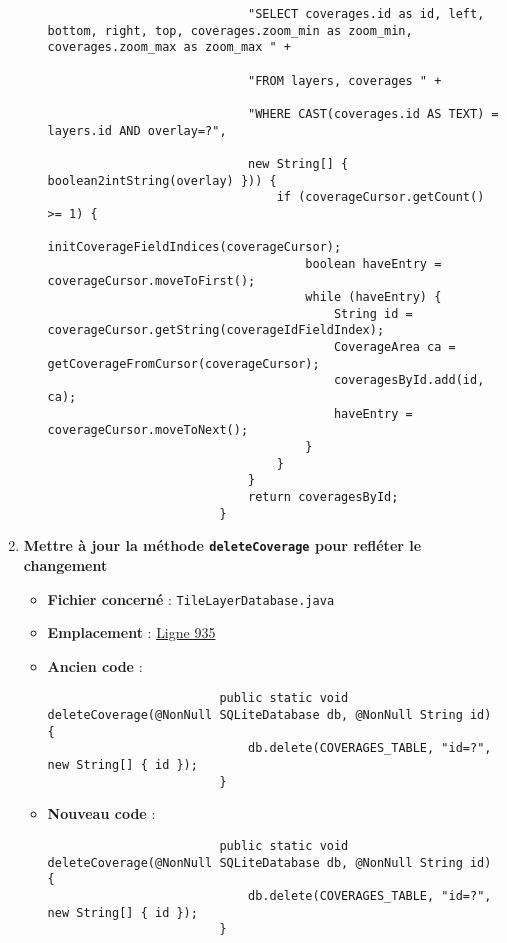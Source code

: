 \begin{enumerate}
\begin{itemize}
\begin{verbatim}
                            "SELECT coverages.id as id, left, bottom, right, top, coverages.zoom_min as zoom_min, coverages.zoom_max as zoom_max " +

                            "FROM layers, coverages " +

                            "WHERE CAST(coverages.id AS TEXT) = layers.id AND overlay=?",

                            new String[] { boolean2intString(overlay) })) {
                                if (coverageCursor.getCount() >= 1) {
                                    initCoverageFieldIndices(coverageCursor);
                                    boolean haveEntry = coverageCursor.moveToFirst();
                                    while (haveEntry) {
                                        String id = coverageCursor.getString(coverageIdFieldIndex);
                                        CoverageArea ca = getCoverageFromCursor(coverageCursor);
                                        coveragesById.add(id, ca);
                                        haveEntry = coverageCursor.moveToNext();
                                    }
                                }
                            }
                            return coveragesById;
                        }
                    \end{verbatim}
          \end{itemize}

    \item \textbf{Mettre à jour la méthode \texttt{deleteCoverage} pour refléter le changement}
          \begin{itemize}
              \item \textbf{Fichier concerné} : \texttt{TileLayerDatabase.java}
              \item \textbf{Emplacement} :
                    \href{https://github.com/MarcusWolschon/osmeditor4android/blob/master/src/main/java/de/blau/android/resources/TileLayerDatabase.java#L935 }{Ligne 935}
              \item \textbf{Ancien code} :
                    \begin{verbatim}
                        public static void deleteCoverage(@NonNull SQLiteDatabase db, @NonNull String id) {
                            db.delete(COVERAGES_TABLE, "id=?", new String[] { id });
                        }
                    \end{verbatim}
              \item \textbf{Nouveau code} :
                    \begin{verbatim}
                        public static void deleteCoverage(@NonNull SQLiteDatabase db, @NonNull String id) {
                            db.delete(COVERAGES_TABLE, "id=?", new String[] { id });
                        }
                    \end{verbatim}
          \end{itemize}


\end{enumerate}
